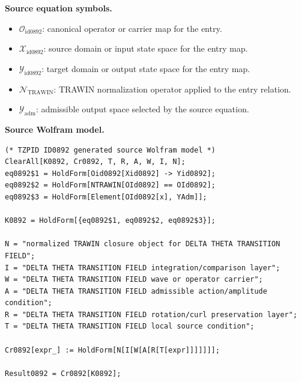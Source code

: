 \begin{minipage}[t]{0.49\linewidth}
\begingroup
\small
\raggedright
\textbf{Source equation symbols.}\par
\begin{itemize}[leftmargin=1.35em,itemsep=1pt,topsep=1pt,parsep=0pt]
    \item $\mathcal{O}_{\mathrm{id0892}}$: canonical operator or carrier map for the entry.
    \item $\mathcal{X}_{\mathrm{id0892}}$: source domain or input state space for the entry map.
    \item $\mathcal{Y}_{\mathrm{id0892}}$: target domain or output state space for the entry map.
    \item $\mathcal{N}_{\mathrm{TRAWIN}}$: TRAWIN normalization operator applied to the entry relation.
    \item $\mathcal{Y}_{\mathrm{adm}}$: admissible output space selected by the source equation.
\end{itemize}
\endgroup
\end{minipage}\hfill
\begin{minipage}[t]{0.47\linewidth}
\begingroup
\scriptsize
\raggedright
\textbf{Source Wolfram model.}\par
\begin{Verbatim}[fontsize=\tiny,breaklines=true,breakanywhere=true]
(* TZPID ID0892 generated source Wolfram model *)
ClearAll[K0892, Cr0892, T, R, A, W, I, N];
eq0892$1 = HoldForm[Oid0892[Xid0892] -> Yid0892];
eq0892$2 = HoldForm[NTRAWIN[OId0892] == OId0892];
eq0892$3 = HoldForm[Element[OId0892[x], YAdm]];

K0892 = HoldForm[{eq0892$1, eq0892$2, eq0892$3}];

N = "normalized TRAWIN closure object for DELTA THETA TRANSITION FIELD";
I = "DELTA THETA TRANSITION FIELD integration/comparison layer";
W = "DELTA THETA TRANSITION FIELD wave or operator carrier";
A = "DELTA THETA TRANSITION FIELD admissible action/amplitude condition";
R = "DELTA THETA TRANSITION FIELD rotation/curl preservation layer";
T = "DELTA THETA TRANSITION FIELD local source condition";

Cr0892[expr_] := HoldForm[N[I[W[A[R[T[expr]]]]]]];

Result0892 = Cr0892[K0892];
\end{Verbatim}
\endgroup
\end{minipage}

